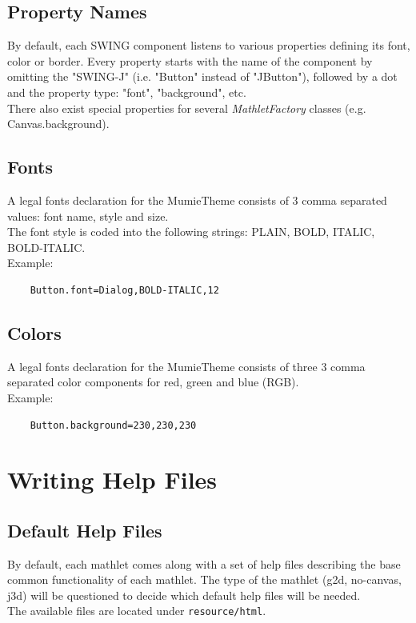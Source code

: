 \documentclass[a4paper,12pt]{book}
\newcommand{\appfac}{\emph{MathletFactory }}
\begin{document}
  \subsection{Property Names}
  By default, each SWING component listens to various properties defining its font, color or
  border. Every property starts with the name of the component by omitting the "SWING-J" (i.e. "Button"
  instead of "JButton"), followed by a dot and the property type: "font", "background", etc.\\
  There also exist special properties for several \appfac classes (e.g. Canvas.background).
  
  \subsection{Fonts}
  A legal fonts declaration for the MumieTheme consists of 3 comma separated values: 
  font name, style and size.\\
  The font style is coded into the following strings: PLAIN, BOLD, ITALIC, BOLD-ITALIC.\\
  Example:\\
  \begin{verbatim}
    Button.font=Dialog,BOLD-ITALIC,12
  \end{verbatim}
  
  \subsection{Colors}
  A legal fonts declaration for the MumieTheme consists of three 3 comma separated color components 
  for red, green and blue (RGB).\\
  Example:\\
  \begin{verbatim}
    Button.background=230,230,230
  \end{verbatim}
  
  \clearpage

\section{Writing Help Files}
  \subsection{Default Help Files}
  By default, each mathlet comes along with a set of help files describing the base common
  functionality of each mathlet. The type of the mathlet (g2d, no-canvas, j3d) will be
  questioned to decide which default help files will be needed.\\
  The available files are located under \verb|resource/html|.
  
\end{document}

